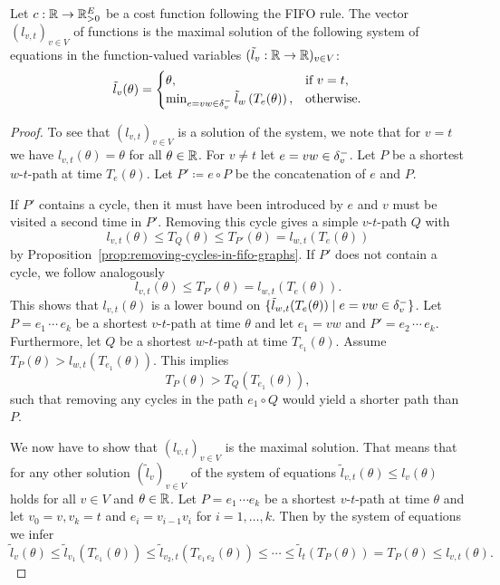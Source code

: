 \begin{proposition}\label{prop:characterization-arrival-functions}
    Let $c:\mathbb{R}\rightarrow\mathbb{R}_{>0}^E$ be a cost function following the FIFO rule.
    The vector $(l_{v,t})_{v\in V}$ of functions is the maximal solution of the following system of equations in the function-valued variables $(\tilde l_v: \mathbb{R} \rightarrow \mathbb{R})_{v\in V}$:
    \[
        \tilde l_v(\theta) = \begin{cases}
            \theta, &\text{if $v = t$}, \\
            \min_{\substack{
                e=vw\in\delta^-_{v}               
            }} \tilde{l}_w\left(
                T_e(\theta)
            \right), &\text{otherwise}.
        \end{cases}
    \]
\end{proposition}
\begin{proof}
    To see that $(l_{v,t})_{v\in V}$ is a solution of the system, we note that for $v = t$ we have $l_{v,t}(\theta) = \theta$ for all $\theta\in\mathbb{R}$.
    For $v\neq t$ let $e=vw\in\delta^-_{v}$.
    Let $P$ be a shortest $w$-$t$-path at time $T_{e}(\theta)$.
    Let $P'\coloneqq e\circ P$ be the concatenation of $e$ and $P$.

    If $P'$ contains a cycle, then it must have been introduced by $e$ and $v$ must be visited a second time in $P'$.
    Removing this cycle gives a simple $v$-$t$-path $Q$ with 
    \[
        l_{v,t}(\theta) \leq T_{Q}(\theta)\leq T_{P'}(\theta) = l_{w,t}(T_{e}(\theta))
    \]
    by Proposition~\ref{prop:removing-cycles-in-fifo-graphs}.
    If $P'$ does not contain a cycle, we follow analogously
    \[
        l_{v,t}(\theta) \leq T_{P'}(\theta) = l_{w,t}(T_{e}(\theta)).
    \]
    This shows that $l_{v,t}(\theta)$ is a lower bound on $\{ \tilde l_{w,t}(
        T_{e}(\theta)
    ) \mid e=vw\in\delta^-_{v}  \}$.
    Let $P = e_1\, \cdots\, e_k$ be a shortest $v$-$t$-path at time $\theta$ and let $e_1=vw$ and $P' = e_2\,\cdots\,e_k$.
    Furthermore, let $Q$ be a shortest $w$-$t$-path at time $T_{e_1}(\theta)$.
    Assume $T_{P}(\theta) > l_{w,t}(T_{e_1}(\theta))$.
    This implies
    \[
        T_{P}(\theta) > 
        T_{Q}(T_{e_1}(\theta)),
    \]
    such that removing any cycles in the path $e_1\circ Q$ would yield a shorter path than $P$.

    We now have to show that $(l_{v,t})_{v\in V}$ is the maximal solution.
    That means that for any other solution $(\tilde l_v)_{v\in V}$ of the system of equations
     $\tilde l_{v,t}(\theta) \leq l_v(\theta)$ holds for all $v\in V$ and $\theta\in\mathbb{R}$.
    Let $P = e_1 \,\cdots e_k$ be a shortest $v$-$t$-path at time $\theta$ and let $v_0 = v, v_k= t$ and $e_i = v_{i-1} v_i$ for $i=1,\dots,k$.
    Then by the system of equations we infer \[
        \tilde l_{v}(\theta) \leq \tilde l_{v_1}(T_{e_1}(\theta)) \leq \tilde l_{v_2,t}(T_{e_1\,e_2} (\theta)) \leq \cdots \leq \tilde l_{t}(T_P(\theta)) = T_P(\theta) \leq l_{v,t}(\theta).
    \]
\end{proof}